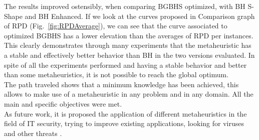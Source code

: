 The results improved ostensibly, when comparing BGBHS optimized, with BH S-Shape and BH Enhanced. If we look at the curves proposed in Comparison graph of RPD (Fig.~\ref{fig:RPDAverage}), we can see that the curve associated to optimized BGBHS has a lower elevation than the averages of RPD per instances. This clearly demonstrates through many experiments that the metaheuristic has a stable and effectively better behavior than BH in the two versions evaluated. In spite of all the experiments performed and having a stable behavior and better than some metaheuristics, it is not possible to reach the global optimum.\\

The path traveled shows that a minimum knowledge has been achieved, this allows to make use of a metaheuristic in any problem and in any domain. All the main and specific objectives were met.\\

As future work, it is proposed the application of different metaheuristics in the field of IT security, trying to improve existing applications, looking for viruses and other threats \cite{Edge_aretrovirus, Mehdi:2009:IIM:1569901.1570109, Noreen:2009:EM:1569901.1570111, Shafiq:2009:AER:1570256.1570370, NajwadiYusoff00000060, DBLP:conf/iccci/DemertzisI15}.















